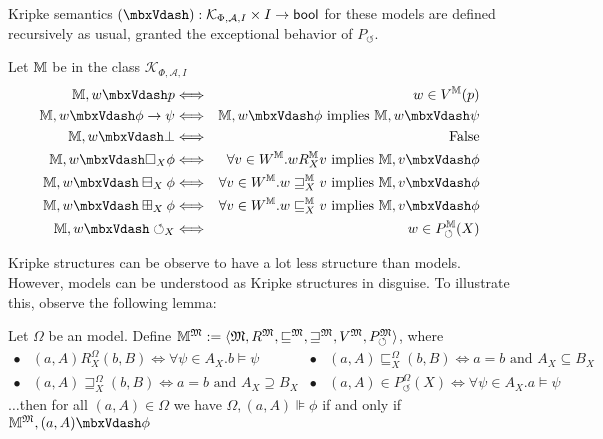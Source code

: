 Kripke semantics $(\Vdash) : \mathcal{K}_{\Phi, \mathcal{A}, I} \times I
\rightarrow \text{\tmtextsf{bool}}$ for these models are defined recursively
as usual, granted the exceptional behavior of $P_{\circlearrowleft}$.

\begin{definition}
  Let $\mathbbm{M}$ be in the class $\mathcal{K}_{\Phi, \mathcal{A}, I}$
  \begin{eqnarray*}
    \mathbbm{M}, w \Vdash p & \Longleftrightarrow & w \in V^{\mathbbm{M}}
    (p)\\
    \mathbbm{M}, w \Vdash \phi \rightarrow \psi & \Longleftrightarrow &
    \mathbbm{M}, w \Vdash \phi \text{ implies } \mathbbm{M}, w \Vdash \psi\\
    \mathbbm{M}, w \Vdash \bot & \Longleftrightarrow & \text{False}\\
    \mathbbm{M}, w \Vdash \Box_X \phi & \Longleftrightarrow & \forall v \in
    W^{\mathbbm{M}} . w R^{\mathbbm{M}}_X v \text{ implies } \mathbbm{M}, v
    \Vdash \phi\\
    \mathbbm{M}, w \Vdash \boxminus_X \phi & \Longleftrightarrow & \forall v
    \in W^{\mathbbm{M}} . w \sqsupseteq^{\mathbbm{M}}_X v \text{ implies }
    \mathbbm{M}, v \Vdash \phi\\
    \mathbbm{M}, w \Vdash \boxplus_X \phi & \Longleftrightarrow & \forall v
    \in W^{\mathbbm{M}} . w \sqsubseteq^{\mathbbm{M}}_X v \text{ implies }
    \mathbbm{M}, v \Vdash \phi\\
    \mathbbm{M}, w \Vdash \circlearrowleft_X & \Longleftrightarrow & w \in
    P_{\circlearrowleft}^{\mathbbm{M}} (X)
  \end{eqnarray*}
\end{definition}

Kripke structures can be observe to have a lot less structure than
 models.  However,  models can be understood as
Kripke structures in disguise.  To illustrate this, observe the following
lemma:

\begin{lemma}
  \label{tranlemma1}Let $\Omega$ be an  model.  Define
  $\mathbbm{M}^{\Omega} \assign \langle \Omega, R^{\Omega},
  \sqsubseteq^{\Omega}, \sqsupseteq^{\Omega}, V^{\Omega},
  P_{\circlearrowleft}^{\Omega} \rangle$, where
  \[ \begin{array}{llll}
       \bullet & \text{$(a, A) R^{\Omega}_X (b, B) \Longleftrightarrow \forall
       \psi \in A_X .b \models \psi$} & \bullet & (a, A)
       \sqsubseteq^{\Omega}_X (b, B) \Longleftrightarrow a = b \text{ and }
       A_X \subseteq B_X\\
       \bullet & (a, A) \sqsupseteq^{\Omega}_X (b, B) \Longleftrightarrow a =
       b \text{ and } A_X \supseteq B_X & \bullet & (a, A) \in
       P_{\circlearrowleft}^{\Omega} (X) \Longleftrightarrow \forall \psi \in
       A_X .a \models \psi
     \end{array} \]
  $\ldots$then for all $(a, A) \in \Omega$ we have $\Omega, (a, A) \VDash
  \phi$ if and only if $\mathbbm{M}^{\Omega}, (a, A) \Vdash \phi$
\end{lemma}

